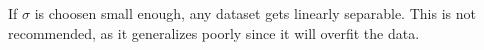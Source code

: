 If $\sigma$ is choosen small enough, any dataset gets linearly separable. This is not recommended, as it generalizes poorly since it will overfit the data.
